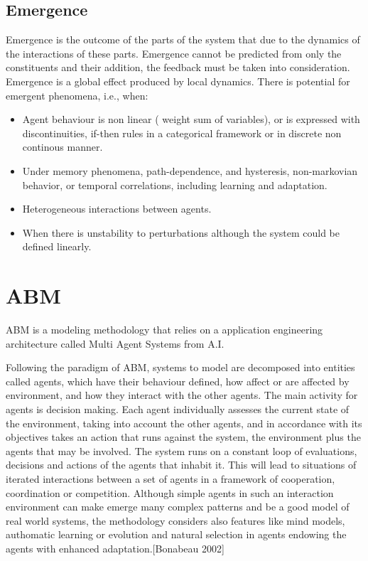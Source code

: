 \documentclass{report}
\begin{document}
\subsection{Emergence}
Emergence is the outcome of the parts of the system that due to the dynamics of the interactions of these parts. Emergence cannot be predicted from only the constituents and their addition, the feedback must be taken into consideration. Emergence is a global effect produced by local dynamics.  
There is potential for emergent phenomena, i.e., when: 
\begin{itemize}
 \item Agent behaviour is non linear ( weight sum of variables), or is expressed with discontinuities, if-then rules in a categorical framework or in discrete non continous manner.
 \item Under memory phenomena, path-dependence, and hysteresis, non-markovian behavior, or temporal correlations, including learning and adaptation. 
 \item Heterogeneous interactions between agents.
 \item When there is unstability to perturbations although the system could be defined linearly.
\end{itemize}


\section{ABM}


ABM is a modeling methodology that relies on a application engineering architecture called Multi Agent Systems from A.I.
 
Following the paradigm of ABM, systems to model are decomposed into entities called agents, which have their behaviour defined,  how affect or are affected by environment, and how they interact with the other agents. The main activity for agents is decision making. Each agent individually assesses the current state of the environment, taking into account the other agents, and in accordance with its objectives takes an action that runs against the system, the environment plus the agents that may be involved. The system runs on a constant loop of evaluations, decisions and actions of the agents that inhabit it.
This will lead to situations of iterated interactions between a set of agents in a framework of cooperation, coordination or competition. Although simple agents in such an interaction environment can  make emerge many complex patterns and be a good model of real world systems, the methodology considers also features like mind models, authomatic learning or evolution and natural selection in agents endowing the agents with enhanced adaptation.[Bonabeau 2002]  
\end{document}
